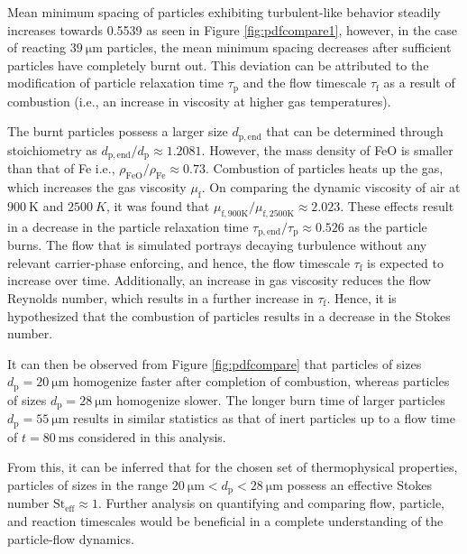\documentclass[twocolumn,10pt,dvipsnames]{article} %
\newcommand{\mrm}[1]{\mathrm{#1}}
\newcommand{\blue}{\color{blue}}
\newcommand{\orange}{\color{orange}}
\begin{document}
{\blue Mean minimum spacing of particles exhibiting turbulent-like behavior steadily increases towards 0.5539 as seen in Figure \ref{fig:pdfcompare1}, however, in the case of reacting $\SI{39}{\micro\meter}$ particles, the mean minimum spacing decreases after sufficient particles have completely burnt out. This deviation can be attributed to the modification of particle relaxation time $\tau_\mrm{p}$ and the flow timescale $\tau_\mrm{f}$ as a result of combustion (i.e., an increase in viscosity at higher gas temperatures).}

{\orange The burnt particles possess a larger size $d_\mrm{p,end}$ that can be determined through stoichiometry as $d_\mrm{p,end} / d_\mrm{p} \approx 1.2081$. However, the mass density of FeO is smaller than that of Fe i.e., $\rho_\mrm{FeO} / \rho_\mrm{Fe} \approx 0.73$. Combustion of particles heats up the gas, which increases the gas viscosity $\mu_\mrm{f}$. On comparing the dynamic viscosity of air at $\SI{900}{\kelvin}$ and $\SI{2500}{K}$, it was found that $\mu_\mrm{f,900K} / \mu_\mrm{f,2500K} \approx 2.023$. These effects result in a decrease in the particle relaxation time $\tau_\mrm{p,end} / \tau_\mrm{p} \approx 0.526$ as the particle burns. The flow that is simulated portrays decaying turbulence without any relevant carrier-phase enforcing, and hence, the flow timescale $\tau_\mrm{f}$ is expected to increase over time. Additionally, an increase in gas viscosity reduces the flow Reynolds number, which results in a further increase in $\tau_\mrm{f}$. Hence, it is hypothesized that the combustion of particles results in a decrease in the Stokes number.}

\iffalse 

It can then be observed from Figure \ref{fig:pdfcompare} that particles of sizes $d_\mrm{p} = \SI{20}{\micro\meter}$ homogenize faster after completion of combustion, whereas particles of sizes $d_\mrm{p} = \SI{28}{\micro\meter}$ homogenize slower. The longer burn time of larger particles $d_\mathrm{p} = \SI{55}{\micro\meter}$ results in similar statistics as that of inert particles up to a flow time of $t=\SI{80}{\milli\second}$ considered in this analysis. 

From this, it can be inferred that for the chosen set of thermophysical properties, particles of sizes in the range $\SI{20}{\micro\meter} < d_\mrm{p} < \SI{28}{\micro\meter}$ possess an effective Stokes number $\mrm{St}_\mrm{eff} \approx 1$. Further analysis on quantifying and comparing flow, particle, and reaction timescales would be beneficial in a complete understanding of the particle-flow dynamics.
\end{document}
